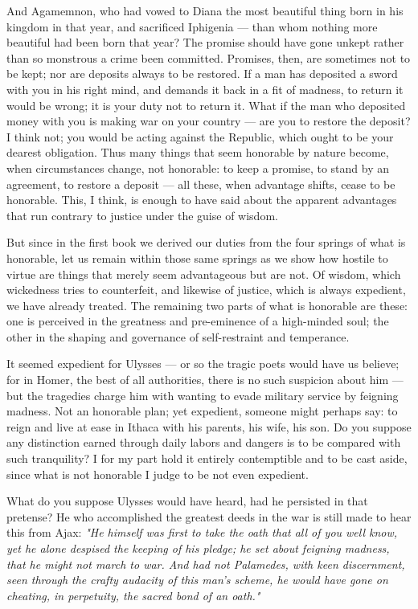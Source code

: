  And Agamemnon, who had vowed to Diana the most beautiful thing born in his kingdom in that year, and sacrificed Iphigenia — than whom nothing more beautiful had been born that year? The promise should have gone unkept rather than so monstrous a crime been committed. Promises, then, are sometimes not to be kept; nor are deposits always to be restored. If a man has deposited a sword with you in his right mind, and demands it back in a fit of madness, to return it would be wrong; it is your duty not to return it. What if the man who deposited money with you is making war on your country — are you to restore the deposit? I think not; you would be acting against the Republic, which ought to be your dearest obligation. Thus many things that seem honorable by nature become, when circumstances change, not honorable: to keep a promise, to stand by an agreement, to restore a deposit — all these, when advantage shifts, cease to be honorable. This, I think, is enough to have said about the apparent advantages that run contrary to justice under the guise of wisdom.

 But since in the first book we derived our duties from the four springs of what is honorable, let us remain within those same springs as we show how hostile to virtue are things that merely seem advantageous but are not. Of wisdom, which wickedness tries to counterfeit, and likewise of justice, which is always expedient, we have already treated. The remaining two parts of what is honorable are these: one is perceived in the greatness and pre-eminence of a high-minded soul; the other in the shaping and governance of self-restraint and temperance.

 It seemed expedient for Ulysses — or so the tragic poets would have us believe; for in Homer, the best of all authorities, there is no such suspicion about him — but the tragedies charge him with wanting to evade military service by feigning madness. Not an honorable plan; yet expedient, someone might perhaps say: to reign and live at ease in Ithaca with his parents, his wife, his son. Do you suppose any distinction earned through daily labors and dangers is to be compared with such tranquility? I for my part hold it entirely contemptible and to be cast aside, since what is not honorable I judge to be not even expedient.

 What do you suppose Ulysses would have heard, had he persisted in that pretense? He who accomplished the greatest deeds in the war is still made to hear this from Ajax: \textit{"He himself was first to take the oath that all of you well know, yet he alone despised the keeping of his pledge; he set about feigning madness, that he might not march to war. And had not Palamedes, with keen discernment, seen through the crafty audacity of this man's scheme, he would have gone on cheating, in perpetuity, the sacred bond of an oath."}

